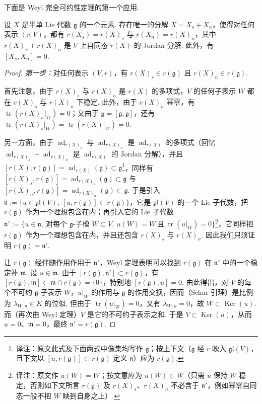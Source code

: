 \begin{numpara}[Jordan 分解]\label{np:ssl-2-5-4}
下面是 Weyl 完全可约性定理的第一个应用.
\begin{theorem*}
设 $X$ 是半单 Lie 代数 $\mathfrak g$ 的一个元素. 存在唯一的分解 $X=X_s+X_n$，使得对任何表示 $(r,V)$，都有 $r(X_s)=r(X)_s$ 与 $r(X_n)=r(X)_n$，其中 $r(X)_s+r(X)_n$ 是 $V$ 上自同态 $r(X)$ 的 Jordan 分解. 此外，有 $[X_s,X_n]=0$.
\end{theorem*}
\begin{proof}
\emph{第一步：}对任何表示 $(V,r)$，有 $r(X)_s\in r(\mathfrak g)$ 且 $r(X)_n\in r(\mathfrak g)$.

首先注意，由于 $r(X)_s$ 与 $r(X)_n$ 是 $r(X)$ 的多项式，$V$ 的任何子表示 $W$ 都在 $r(X)_s$ 与 $r(X)_n$ 下稳定. 此外，由于 $r(X)_n$ 幂零，有 $\operatorname{tr}(r(X)_n|_W)=0$；又由于 $\mathfrak g=[\mathfrak g,\mathfrak g]$，还有 $\operatorname{tr}(r(X)_s|_W)=\operatorname{tr}(r(X)|_W)=0$.

另一方面，由于 $\operatorname{ad}_{r(X)_s}$ 与 $\operatorname{ad}_{r(X)_n}$ 是 $\operatorname{ad}_{r(X)}$ 的多项式（回忆 $\operatorname{ad}_{r(X)_s}+\operatorname{ad}_{r(X)_n}$ 是 $\operatorname{ad}_{r(X)}$ 的 Jordan 分解），并且 $[r(X),r(\mathfrak g)]=\operatorname{ad}_{r(X)}(\mathfrak g)\subset\mathfrak g$\footnote{译注：原文此式及下面两式中像集均写作 $\mathfrak g$；按上下文（$\mathfrak g$ 经 $r$ 映入 $\mathfrak{gl}(V)$，且下文以 $[u,r(\mathfrak g)]\subset r(\mathfrak g)$ 定义 $\mathfrak n$）应为 $r(\mathfrak g)$.}，同样有 $[r(X)_s,r(\mathfrak g)]=\operatorname{ad}_{r(X)_s}(\mathfrak g)\subset\mathfrak g$ 与 $[r(X)_n,r(\mathfrak g)]=\operatorname{ad}_{r(X)_n}(\mathfrak g)\subset\mathfrak g$. 于是引入 $\mathfrak n:=\{u\in\mathfrak{gl}(V),\ [u,r(\mathfrak g)]\subset r(\mathfrak g)\}$，它是 $\mathfrak{gl}(V)$ 的一个 Lie 子代数，把 $r(\mathfrak g)$ 作为一个理想包含在内；再引入它的 Lie 子代数 $\mathfrak n':=\{u\in\mathfrak n,\ \text{对每个 }\mathfrak g\text{-子模 }W\subset V,\ u(W)=W\ \text{且}\ \operatorname{tr}(u|_W)=0\}$\footnote{译注：原文作 $u(W)=W$；按文意应为 $u(W)\subset W$（只需 $u$ 保持 $W$ 稳定，否则如下文所言 $r(\mathfrak g)$ 及 $r(X)_s$、$r(X)_n$ 不必含于 $\mathfrak n'$，例如幂零自同态一般不把 $W$ 映到自身之上）.}，它同样把 $r(\mathfrak g)$ 作为一个理想包含在内，并且还包含 $r(X)_s$ 与 $r(X)_n$. 因此我们只须证明 $r(\mathfrak g)=\mathfrak n'$.

让 $r(\mathfrak g)$ 经伴随作用作用于 $\mathfrak n'$，Weyl 定理表明可以找到 $r(\mathfrak g)$ 在 $\mathfrak n'$ 中的一个稳定补 $\mathfrak m$. 设 $u\in\mathfrak m$. 由于 $[r(\mathfrak g),\mathfrak n']\subset r(\mathfrak g)$，有 $[r(\mathfrak g),\mathfrak m]\subset\mathfrak m\cap r(\mathfrak g)=\{0\}$，特别地 $[r(\mathfrak g),u]=0$. 由此得出，对 $V$ 的每个不可约 $\mathfrak g$-子表示 $W$，$u|_W$ 的作用与 $\mathfrak g$ 的作用交换，因而（Schur 引理）是比例为 $\lambda_{W,u}\in K$ 的位似. 但由于 $\operatorname{tr}(u|_W)=0$，又有 $\lambda_{W,u}=0$，故 $W\subset\operatorname{Ker}(u)$. 而（再次由 Weyl 定理）$V$ 是它的不可约子表示之和. 于是 $V\subset\operatorname{Ker}(u)$，从而 $u=0$、$\mathfrak m=0$，最终 $\mathfrak n'=r(\mathfrak g)$.


\end{proof}
\end{numpara}
